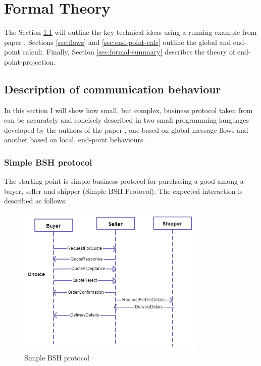 \chapter{Formal Theory}

The Section \ref{sec:description} will outline the key technical ideas using a running example from paper \cite{structured-com-centered-prog}. Sections \ref{sec:flows} and \ref{sec:end-point-calc} outline the global and end-point calculi. Finally, Section \ref{sec:formal-summary} describes the theory of end-point-projection.

\section{Description of communication behaviour}
\label{sec:description}

In this section I will show how small, but complex, business protocol taken from \cite{wscdlprimer} can be accurately and concisely described in two small programming languages developed by the authors of the paper \cite{structured-com-centered-prog}, one based on global message flows and another based on local, end-point behaviours.

\subsection{Simple BSH protocol}

The starting point is simple business protocol for purchasing a good among a buyer, seller and shipper (Simple BSH Protocol). The expected interaction is described as follows:

\begin{figure}
\centering
\includegraphics[width=0.8\textwidth]{resources/Simple_bsh.png}
\caption{Simple BSH protocol}
\label{fig:simple-bsh}
\end{figure}

